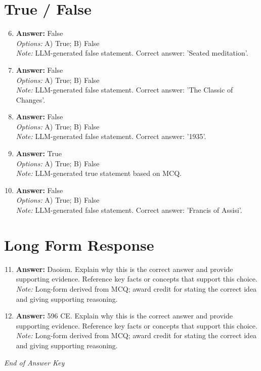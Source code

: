 \documentclass[12pt]{article}
\begin{document}
\section*{True / False}
\begin{enumerate}[label=\arabic*.]
\setcounter{enumi}{5}
\item \textbf{Answer:} False
\\ \textit{Options:} A) True; B) False
\\ \textit{Note:} LLM-generated false statement. Correct answer: 'Seated meditation'.
\item \textbf{Answer:} False
\\ \textit{Options:} A) True; B) False
\\ \textit{Note:} LLM-generated false statement. Correct answer: 'The Classic of Changes'.
\item \textbf{Answer:} False
\\ \textit{Options:} A) True; B) False
\\ \textit{Note:} LLM-generated false statement. Correct answer: '1935'.
\item \textbf{Answer:} True
\\ \textit{Options:} A) True; B) False
\\ \textit{Note:} LLM-generated true statement based on MCQ.
\item \textbf{Answer:} False
\\ \textit{Options:} A) True; B) False
\\ \textit{Note:} LLM-generated false statement. Correct answer: 'Francis of Assisi'.
\end{enumerate}

\section*{Long Form Response}
\begin{enumerate}[label=\arabic*.]
\setcounter{enumi}{10}
\item \textbf{Answer:} Daoism. Explain why this is the correct answer and provide supporting evidence. Reference key facts or concepts that support this choice.
\\ \textit{Note:} Long-form derived from MCQ; award credit for stating the correct idea and giving supporting reasoning.
\item \textbf{Answer:} 596 CE. Explain why this is the correct answer and provide supporting evidence. Reference key facts or concepts that support this choice.
\\ \textit{Note:} Long-form derived from MCQ; award credit for stating the correct idea and giving supporting reasoning.
\end{enumerate}

\vfill
\noindent\textit{End of Answer Key}
\end{document}
